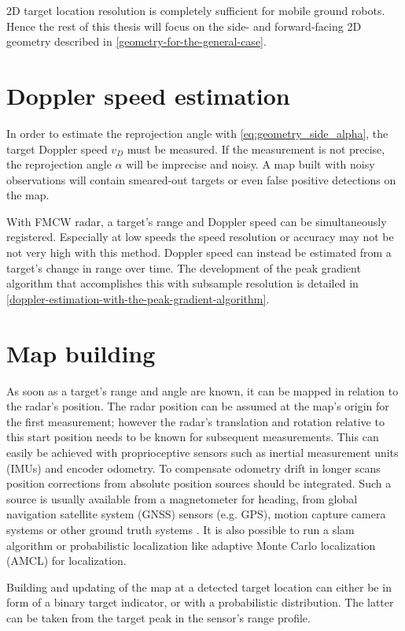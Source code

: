 2D target location resolution is completely sufficient for mobile ground robots. Hence the rest of this thesis will focus on the side- and forward-facing 2D geometry described in \cref{geometry-for-the-general-case}.

\section{Doppler speed estimation}\label{doppler-speed-estimation}

In order to estimate the reprojection angle with \cref{eq:geometry_side_alpha}, the target Doppler speed $v_D$ must be measured. If the measurement is not precise, the reprojection angle \(\alpha\) will be imprecise and noisy. A map built with noisy observations will contain smeared-out targets or even false positive detections on the map.

With FMCW radar, a target's range and Doppler speed can be simultaneously registered. Especially at low speeds the speed resolution or accuracy may not be not very high with this method. Doppler speed can instead be estimated from a target's change in range over time. The development of the peak gradient algorithm that accomplishes this with subsample resolution is detailed in \cref{doppler-estimation-with-the-peak-gradient-algorithm}.

\section{Map building}\label{reprojection-method}

As soon as a target's range and angle are known, it can be mapped in relation
to the radar's position. The radar position can be assumed at the map's origin for the first measurement; however the radar's translation and rotation relative to this start position needs to be known for subsequent measurements. This can easily be achieved with proprioceptive sensors such as inertial measurement units (IMUs) and encoder odometry. To compensate odometry drift in longer scans position corrections from absolute position sources should be integrated. Such a source is usually available from a magnetometer for heading, from global navigation satellite system (GNSS) sensors (e.g. GPS), motion capture camera systems or other ground truth systems \cite{Godil2013}. It is also possible to run a slam algorithm or probabilistic localization like adaptive Monte Carlo localization (AMCL) for localization.

Building and updating of the map at a detected target location can either be in form of a binary target indicator, or with a probabilistic distribution. The latter can be taken from the target peak in the sensor's range profile.

